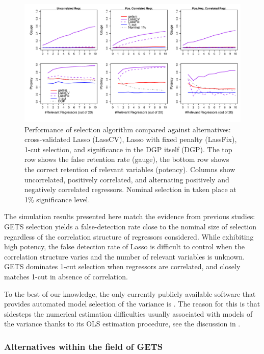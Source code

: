 \documentclass[article,nojss]{jss}
\begin{document}
\begin{figure}[t!]
  \centering
  \includegraphics[width=\textwidth, trim = 0 0 0 0, clip]{fig_getsm_performance_v2.pdf}
  \caption{Performance of  selection algorithm compared
    against alternatives: cross-validated Lasso (LassCV), Lasso with
    fixed penalty (LassFix), 1-cut selection, and significance in the
    DGP itself (DGP). The top row shows the false retention rate (gauge),
    the bottom row shows the correct retention of relevant variables
    (potency). Columns show uncorrelated, positively correlated, and
    alternating positively and negatively correlated
    regressors. Nominal selection in  taken place at 1\%
    significance level. \label{fig_lass} }
\end{figure}

The simulation results presented here match the evidence from previous studies: GETS selection yields a false-detection rate close to the nominal size of selection regardless of the correlation structure of regressors considered. While exhibiting high potency, the false detection rate of Lasso is difficult to control when the correlation structure varies and the number of relevant variables is unknown. GETS dominates 1-cut selection when regressors are correlated, and closely matches 1-cut in absence of correlation.

To the best of our knowledge, the only currently publicly available software that provides automated model selection of the variance is . The reason for this is that  sidesteps the numerical estimation difficulties usually associated with models of the variance thanks to its OLS estimation procedure, see the discussion in \cite{SucarratEscribano2012}.

\subsubsection{Alternatives within the field of GETS}
\label{sec:getsalt}
\end{document}

